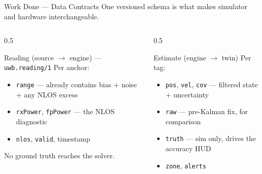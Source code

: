 \documentclass[aspectratio=169,10pt]{beamer}
\begin{document}
\begin{frame}{Work Done --- Data Contracts}
  One versioned schema is what makes simulator and hardware interchangeable.
  \begin{columns}[T]
    \begin{column}{0.5\textwidth}
      \begin{block}{Reading (source $\rightarrow$ engine) --- \texttt{uwb.reading/1}}
        \footnotesize Per anchor:
        \begin{itemize}\scriptsize
          \item \texttt{range} --- already contains bias + noise + any NLOS excess
          \item \texttt{rxPower}, \texttt{fpPower} --- the NLOS diagnostic
          \item \texttt{nlos}, \texttt{valid}, timestamp
        \end{itemize}
        \alert{No ground truth reaches the solver.}
      \end{block}
    \end{column}
    \begin{column}{0.5\textwidth}
      \begin{block}{Estimate (engine $\rightarrow$ twin)}
        \footnotesize Per tag:
        \begin{itemize}\scriptsize
          \item \texttt{pos}, \texttt{vel}, \texttt{cov} --- filtered state + uncertainty
          \item \texttt{raw} --- pre-Kalman fix, for comparison
          \item \texttt{truth} --- sim only, drives the accuracy HUD
          \item \texttt{zone}, \texttt{alerts}
        \end{itemize}
      \end{block}
    \end{column}
  \end{columns}
\end{frame}
\end{document}
